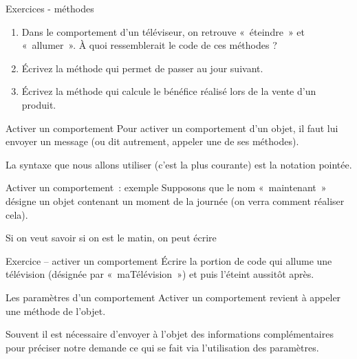 \begin{frame}{Exercices - méthodes}
	\begin{enumerate}
	\item 
		Dans le comportement d'un téléviseur, on retrouve
		«~éteindre~» et «~allumer~». 
		À quoi ressemblerait le code de ces méthodes ?
	\item 
		Écrivez la méthode qui permet de passer au jour suivant.
	\item 
		Écrivez la méthode qui calcule 
		le bénéfice réalisé lors de la vente d'un produit.
	\end{enumerate}
\end{frame}

\begin{frame}{Activer un comportement}
	Pour activer un comportement d'un objet, 
	il faut lui envoyer un message 
	(ou dit autrement, appeler une de ses méthodes). 
	
	\bigskip
	
	La syntaxe que nous allons utiliser 
	(c'est la plus courante) est la notation pointée.
	
	\bigskip

\end{frame}

\begin{frame}{Activer un comportement~: exemple}
		Supposons que le nom «~maintenant~» 
		désigne un objet contenant un moment de la journée 
		(on verra comment réaliser cela). 
		
		\bigskip
		
		Si on veut savoir si on est le matin, on peut écrire
		
		\bigskip

\end{frame}

\begin{frame}{Exercice – activer un comportement}
	Écrire la portion de code qui allume une télévision 
	(désignée par «~maTélévision~») 
	et puis l'éteint aussitôt après.		
\end{frame}

\begin{frame}{Les paramètres d'un comportement}
		Activer un comportement revient à appeler une méthode de
		l'objet. 
		
		\bigskip
		
		Souvent il est nécessaire
		d'envoyer à l'objet des informations
		complémentaires pour préciser notre demande ce qui se fait via
		l'utilisation des paramètres.
\end{frame}

